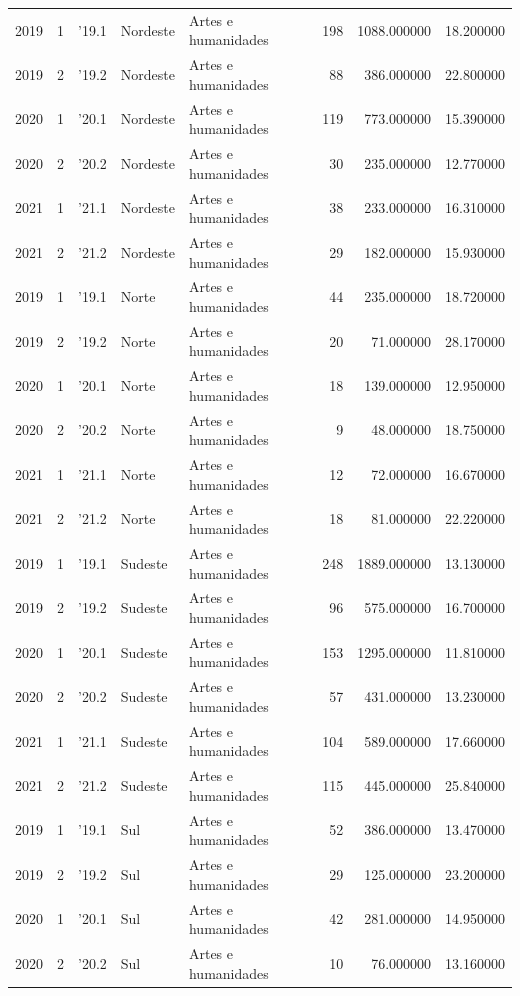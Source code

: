 \begin{longtable}{rrlllrrr}
2019 & 1 & '19.1 & Nordeste & Artes e humanidades & 198 & 1088.000000 & 18.200000 \\
2019 & 2 & '19.2 & Nordeste & Artes e humanidades & 88 & 386.000000 & 22.800000 \\
2020 & 1 & '20.1 & Nordeste & Artes e humanidades & 119 & 773.000000 & 15.390000 \\
2020 & 2 & '20.2 & Nordeste & Artes e humanidades & 30 & 235.000000 & 12.770000 \\
2021 & 1 & '21.1 & Nordeste & Artes e humanidades & 38 & 233.000000 & 16.310000 \\
2021 & 2 & '21.2 & Nordeste & Artes e humanidades & 29 & 182.000000 & 15.930000 \\
2019 & 1 & '19.1 & Norte & Artes e humanidades & 44 & 235.000000 & 18.720000 \\
2019 & 2 & '19.2 & Norte & Artes e humanidades & 20 & 71.000000 & 28.170000 \\
2020 & 1 & '20.1 & Norte & Artes e humanidades & 18 & 139.000000 & 12.950000 \\
2020 & 2 & '20.2 & Norte & Artes e humanidades & 9 & 48.000000 & 18.750000 \\
2021 & 1 & '21.1 & Norte & Artes e humanidades & 12 & 72.000000 & 16.670000 \\
2021 & 2 & '21.2 & Norte & Artes e humanidades & 18 & 81.000000 & 22.220000 \\
2019 & 1 & '19.1 & Sudeste & Artes e humanidades & 248 & 1889.000000 & 13.130000 \\
2019 & 2 & '19.2 & Sudeste & Artes e humanidades & 96 & 575.000000 & 16.700000 \\
2020 & 1 & '20.1 & Sudeste & Artes e humanidades & 153 & 1295.000000 & 11.810000 \\
2020 & 2 & '20.2 & Sudeste & Artes e humanidades & 57 & 431.000000 & 13.230000 \\
2021 & 1 & '21.1 & Sudeste & Artes e humanidades & 104 & 589.000000 & 17.660000 \\
2021 & 2 & '21.2 & Sudeste & Artes e humanidades & 115 & 445.000000 & 25.840000 \\
2019 & 1 & '19.1 & Sul & Artes e humanidades & 52 & 386.000000 & 13.470000 \\
2019 & 2 & '19.2 & Sul & Artes e humanidades & 29 & 125.000000 & 23.200000 \\
2020 & 1 & '20.1 & Sul & Artes e humanidades & 42 & 281.000000 & 14.950000 \\
2020 & 2 & '20.2 & Sul & Artes e humanidades & 10 & 76.000000 & 13.160000 \\

\end{longtable}
